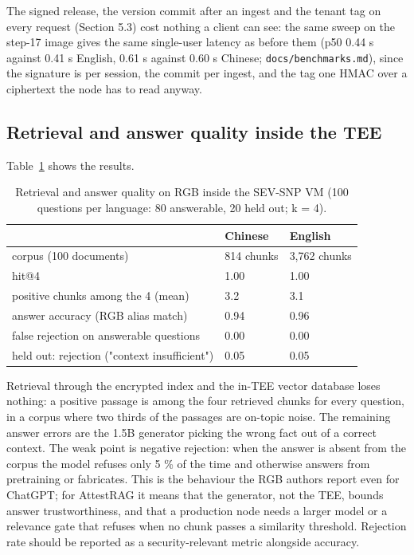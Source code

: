\documentclass[letterpaper,twocolumn,10pt]{article}
\begin{document}
The signed release, the version commit after an ingest and the tenant tag on every request (Section 5.3) cost nothing a client can see: the same sweep on the step-17 image gives the same single-user latency as before them (p50 0.44 s against 0.41 s English, 0.61 s against 0.60 s Chinese; \texttt{docs/benchmarks.md}), since the signature is per session, the commit per ingest, and the tag one HMAC over a ciphertext the node has to read anyway.

\subsection{Retrieval and answer quality inside the TEE}\label{retrieval-and-answer-quality-inside-the-tee}

Table~\ref{tab:quality} shows the results.

\begin{table}[t]\centering\small\setlength{\tabcolsep}{4pt}
\begin{tabular}{p{1.55in}ll}\toprule
 & \textbf{Chinese} & \textbf{English} \\ \midrule
corpus (100 documents) & 814 chunks & 3,762 chunks \\
hit@4 & 1.00 & 1.00 \\
positive chunks among the 4 (mean) & 3.2 & 3.1 \\
answer accuracy (RGB alias match) & 0.94 & 0.96 \\
false rejection on answerable questions & 0.00 & 0.00 \\
held out: rejection ("context insufficient") & 0.05 & 0.05 \\
\bottomrule\end{tabular}
\caption{Retrieval and answer quality on RGB inside the SEV-SNP VM (100 questions per language: 80 answerable, 20 held out; k = 4).}\label{tab:quality}
\end{table}

Retrieval through the encrypted index and the in-TEE vector database loses nothing: a positive passage is among the four retrieved chunks for every question, in a corpus where two thirds of the passages are on-topic noise. The remaining answer errors are the 1.5B generator picking the wrong fact out of a correct context. The weak point is negative rejection: when the answer is absent from the corpus the model refuses only 5 \% of the time and otherwise answers from pretraining or fabricates. This is the behaviour the RGB authors report even for ChatGPT; for AttestRAG it means that the generator, not the TEE, bounds answer trustworthiness, and that a production node needs a larger model or a relevance gate that refuses when no chunk passes a similarity threshold. Rejection rate should be reported as a security-relevant metric alongside accuracy.
\end{document}
